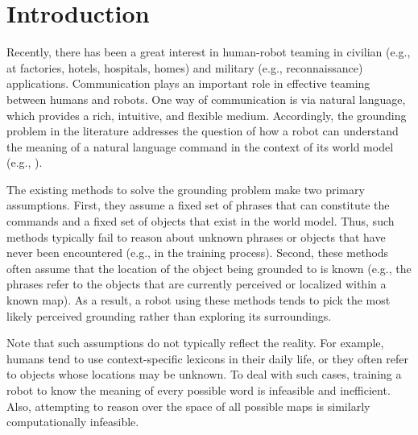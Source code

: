 \section{Introduction}
Recently, there has been a great interest in human-robot teaming in civilian (e.g., at factories, hotels, hospitals, homes) and military (e.g., reconnaissance) applications. Communication plays an important role in effective teaming between humans and robots. One way of communication is via natural language, which provides a rich, intuitive, and flexible medium. Accordingly, the grounding problem in the literature addresses the question of how a robot can understand the meaning of a natural language command in the context of its world model (e.g., \cite{g3,dcg,adcg2016}). 

The existing methods to solve the grounding problem make two primary assumptions. First, they assume a fixed set of phrases that can constitute the commands and a fixed set of objects that exist in the world model. Thus, such methods typically fail to reason about unknown phrases or objects that have never been encountered (e.g., in the training process).
Second, these methods often assume that the location of the object being grounded to is known (e.g., the phrases refer to the objects that are currently perceived or localized within a known map).
As a result, a robot using these methods tends to pick the most likely perceived grounding rather than exploring its surroundings.

Note that such assumptions do not typically reflect the reality. For example, humans tend to use context-specific lexicons in their daily life, or they often refer to objects whose locations may be unknown. To deal with such cases, training a robot to know the meaning of every possible word is infeasible and inefficient. Also, attempting to reason over the space of all possible maps is similarly computationally infeasible.

